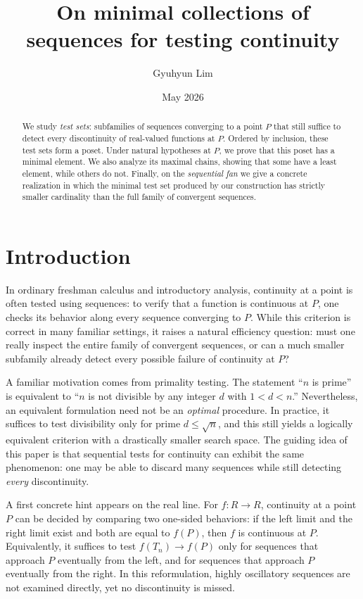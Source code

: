 \documentclass[11pt]{amsart}
\title[Minimal collections of sequences]{On minimal collections of sequences for testing continuity}
\author{Gyuhyun Lim}
\date{May 2026}
\theoremstyle{plain}
\theoremstyle{definition}
\theoremstyle{remark}
\newcommand{\R}{\mathbb{R}}
\def\R{R}%
\begin{document}
\begin{abstract}
We study \emph{test sets}: subfamilies of sequences converging to a point $P$ that still suffice to detect every discontinuity of real-valued functions at $P$.
Ordered by inclusion, these test sets form a poset.
Under natural hypotheses at $P$, we prove that this poset has a minimal element.
We also analyze its maximal chains, showing that some have a least element, while others do not.
Finally, on the \emph{sequential fan} we give a concrete realization in which the minimal test set produced by our construction has strictly smaller cardinality than the full family of convergent sequences.
\end{abstract}

\maketitle
\tableofcontents

\section{Introduction}\label{sec:intro}

In ordinary freshman calculus and introductory analysis, continuity at a point is often tested using sequences:
to verify that a function is continuous at $P$, one checks its behavior along every sequence converging to $P$.
While this criterion is correct in many familiar settings, it raises a natural efficiency question:
must one really inspect the entire family of convergent sequences, or can a much smaller subfamily already detect every possible failure of continuity at $P$?

A familiar motivation comes from primality testing.
The statement ``$n$ is prime'' is equivalent to ``$n$ is not divisible by any integer $d$ with $1<d<n$.'' Nevertheless, an equivalent formulation need not be an \emph{optimal} procedure.
In practice, it suffices to test divisibility only for prime $d\le \sqrt{n}$, and this still yields a logically equivalent criterion with a drastically smaller search space.
The guiding idea of this paper is that sequential tests for continuity can exhibit the same phenomenon:
one may be able to discard many sequences while still detecting \emph{every} discontinuity.

A first concrete hint appears on the real line.
For $f:\R\to\R$, continuity at a point $P$ can be decided by comparing two one-sided behaviors:
if the left limit and the right limit exist and both are equal to $f(P)$, then $f$ is continuous at $P$.
Equivalently, it suffices to test $f(T_n)\to f(P)$ only for sequences that approach $P$ eventually from the left,
and for sequences that approach $P$ eventually from the right.
In this reformulation, highly oscillatory sequences are not examined directly, yet no discontinuity is missed.
\end{document}
